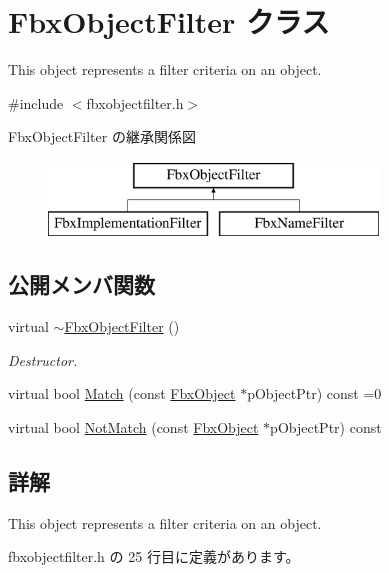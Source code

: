\hypertarget{class_fbx_object_filter}{}\section{Fbx\+Object\+Filter クラス}
\label{class_fbx_object_filter}


This object represents a filter criteria on an object.  




{\ttfamily \#include $<$fbxobjectfilter.\+h$>$}

Fbx\+Object\+Filter の継承関係図\begin{figure}[H]
\begin{center}
\leavevmode
\includegraphics[height=2.000000cm]{class_fbx_object_filter}
\end{center}
\end{figure}
\subsection*{公開メンバ関数}
\begin{DoxyCompactItemize}
\item 
virtual \hyperlink{class_fbx_object_filter_a811d3a582860aaebe5d8008496fc6954}{$\sim$\+Fbx\+Object\+Filter} ()
\begin{DoxyCompactList}\small\item\em Destructor. \end{DoxyCompactList}\item 
virtual bool \hyperlink{class_fbx_object_filter_a49cc7b7c109f98910241d62ec0bd093b}{Match} (const \hyperlink{class_fbx_object}{Fbx\+Object} $\ast$p\+Object\+Ptr) const =0
\item 
virtual bool \hyperlink{class_fbx_object_filter_a1920c73e0044a43ae151175d788e7674}{Not\+Match} (const \hyperlink{class_fbx_object}{Fbx\+Object} $\ast$p\+Object\+Ptr) const
\end{DoxyCompactItemize}


\subsection{詳解}
This object represents a filter criteria on an object. 

 fbxobjectfilter.\+h の 25 行目に定義があります。



